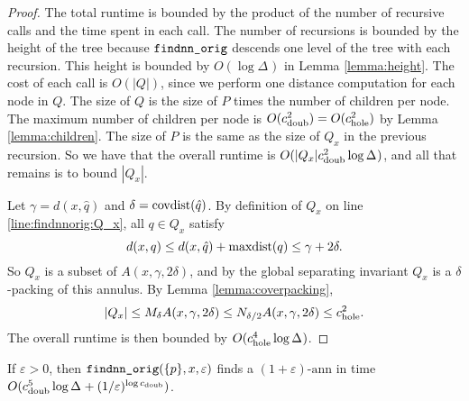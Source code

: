 \documentclass[thesis.tex]{subfiles}
\newcommand{\dist}[2]{\distf({#1},{#2})}
\newcommand{\distf}{d}
\newcommand{\aspect}[1]{\Delta_{#1}}
\newcommand{\cdoub}{c_\textnormal{doub}}
\newcommand{\chole}{c_\textnormal{hole}}
\newcommand{\eann}{(1+\varepsilon)\text{-ann}}
\newcommand{\mkfunction}[1]{\ifmmode{\textnormal{{#1}}}}
\newcommand{\covdist}[1]    {\mkfunction{covdist}({#1})}
\newcommand{\maxdist}[1]    {\mkfunction{maxdist}({#1})}
\newcommand{\findnnorig}{\mkprocedure{findnn\_orig}}
\begin{document}
\begin{proof}
    The total runtime is bounded by the product of the number of recursive calls and the time spent in each call.
    The number of recursions is bounded by the height of the tree because $\findnnorig$ descends one level of the tree with each recursion.
    This height is bounded by $O(\log\aspect{})$ in Lemma \ref{lemma:height}.
    The cost of each call is $O(|Q|)$,
    since we perform one distance computation for each node in $Q$.
    The size of $Q$ is the size of $P$ times the number of children per node.
    The maximum number of children per node is $O(\cdoub^2) = O(\chole^2)$ by Lemma \ref{lemma:children}.
    The size of $P$ is the same as the size of $Q_x$ in the previous recursion.
    So we have that the overall runtime is $O(|Q_x|\cdoub^2\log\aspect{})$,
    and all that remains is to bound $|Q_x|$.

    Let $\gamma=\dist{x}{\hat q}$ and $\delta=\covdist{\hat q}$.
    By definition of $Q_x$ on line \ref{line:findnnorig:Q_x}, all $q\in Q_x$ satisfy
    \begin{equation}
        \dist{x}{q} \le \dist{x}{\hat q} + \maxdist{q} \le \gamma+2\delta
        .
    \end{equation}
    So $Q_x$ is a subset of $A(x,\gamma,2\delta)$,
    and by the global separating invariant $Q_x$ is a $\delta$-packing of this annulus.
    By Lemma \ref{lemma:coverpacking},
    \begin{equation}
        |Q_x| 
        \le M_\delta A(x,\gamma,2\delta)     
        \le N_{\delta/2} A(x,\gamma,2\delta)
        \le \chole^2
        .
    \end{equation}
    The overall runtime is then bounded by $O(\chole^4\log\aspect{})$.
\end{proof}

\begin{theorem}
    \label{theorem:findnnorig:runtime:approx2}
    If $\varepsilon > 0$,
    then $\findnnorig(\{p\},x,\varepsilon)$ finds a $\eann$ in time $O(\cdoub^5\log\aspect{} + (1/\varepsilon)^{\log \cdoub})$.
\end{theorem}
\end{document}
